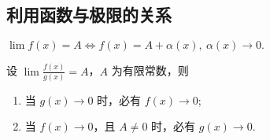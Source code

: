 \subsection{利用函数与极限的关系}

\begin{theorem}[极限值与函数式的转换]
    $\lim f(x)=A\Leftrightarrow f(x)=A+\alpha(x),~\alpha(x)\to0.$
\end{theorem}

\begin{theorem}[分式极限的关系]
    设 $\displaystyle\lim\frac{f(x)}{g(x)}=A$，$A$ 为有限常数，则
    \label{f(x)g(x)A}
    \begin{enumerate}[label=(\arabic{*})]
        \item 当 $g(x)\to0$ 时，必有 $f(x)\to0$;
        \item 当 $f(x)\to0$，且 $A\not=0$ 时，必有 $g(x)\to0$.
    \end{enumerate}
\end{theorem}

